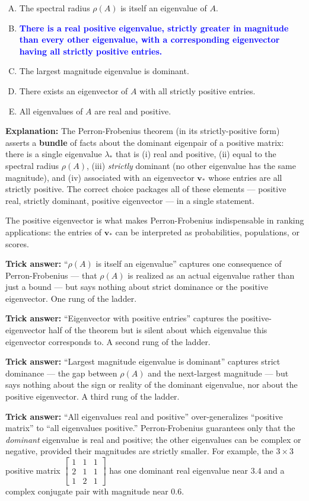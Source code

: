 \documentclass[12pt]{amsart}
\begin{document}
\begin{enumerate}[(A)]
\item The spectral radius $\rho(A)$ is itself an eigenvalue of $A$.
\item \textcolor{blue}{\textbf{There is a real positive eigenvalue, strictly greater in magnitude than every other eigenvalue, with a corresponding eigenvector having all strictly positive entries.}}
\item The largest magnitude eigenvalue is dominant.
\item There exists an eigenvector of $A$ with all strictly positive entries.
\item All eigenvalues of $A$ are real and positive.
\end{enumerate}

\textbf{Explanation:}
The Perron-Frobenius theorem (in its strictly-positive form) asserts a
\textbf{bundle} of facts about the dominant eigenpair of a positive matrix:
there is a single eigenvalue $\lambda_*$ that is (i) real and positive,
(ii) equal to the spectral radius $\rho(A)$, (iii) \emph{strictly} dominant
(no other eigenvalue has the same magnitude), and (iv) associated with an
eigenvector $\mathbf{v}_*$ whose entries are all strictly positive. The
correct choice packages all of these elements --- positive real, strictly
dominant, positive eigenvector --- in a single statement.

The positive eigenvector is what makes Perron-Frobenius indispensable in
ranking applications: the entries of $\mathbf{v}_*$ can be interpreted as
probabilities, populations, or scores.

\textbf{Trick answer:}
``$\rho(A)$ is itself an eigenvalue'' captures one consequence of
Perron-Frobenius --- that $\rho(A)$ is realized as an actual eigenvalue
rather than just a bound --- but says nothing about strict dominance or
the positive eigenvector. One rung of the ladder.

\textbf{Trick answer:}
``Eigenvector with positive entries'' captures the positive-eigenvector
half of the theorem but is silent about which eigenvalue this eigenvector
corresponds to. A second rung of the ladder.

\textbf{Trick answer:}
``Largest magnitude eigenvalue is dominant'' captures strict dominance ---
the gap between $\rho(A)$ and the next-largest magnitude --- but says
nothing about the sign or reality of the dominant eigenvalue, nor about
the positive eigenvector. A third rung of the ladder.

\textbf{Trick answer:}
``All eigenvalues real and positive'' over-generalizes ``positive matrix''
to ``all eigenvalues positive.'' Perron-Frobenius guarantees only that the
\emph{dominant} eigenvalue is real and positive; the other eigenvalues
can be complex or negative, provided their magnitudes are strictly smaller.
For example, the $3 \times 3$ positive matrix
$\begin{bmatrix} 1 & 1 & 1 \\ 2 & 1 & 1 \\ 1 & 2 & 1 \end{bmatrix}$ has
one dominant real eigenvalue near $3.4$ and a complex conjugate pair with
magnitude near $0.6$.
\end{document}
